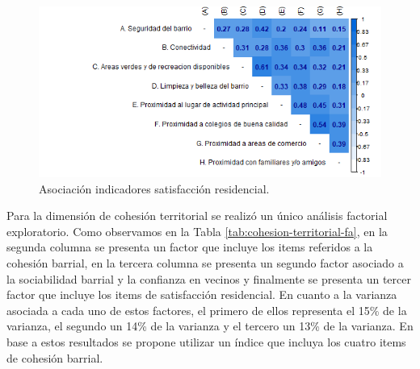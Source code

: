\documentclass[
  12pt,
]{book}
\begin{document}
\begin{figure}[H]

{\centering \includegraphics[width=1\linewidth,height=1\textheight]{output/graphs/satisfaccion-residencial_cor} 

}

\caption{Asociación indicadores satisfacción residencial.}\label{fig:satisfaccion-residencial-cor}
\end{figure}

Para la dimensión de cohesión territorial se realizó un único análisis factorial exploratorio. Como observamos en la Tabla \ref{tab:cohesion-territorial-fa}, en la segunda columna se presenta un factor que incluye los items referidos a la cohesión barrial, en la tercera columna se presenta un segundo factor asociado a la sociabilidad barrial y la confianza en vecinos y finalmente se presenta un tercer factor que incluye los items de satisfacción residencial. En cuanto a la varianza asociada a cada uno de estos factores, el primero de ellos representa el 15\% de la varianza, el segundo un 14\% de la varianza y el tercero un 13\% de la varianza. En base a estos resultados se propone utilizar un índice que incluya los cuatro items de cohesión barrial.
\end{document}
